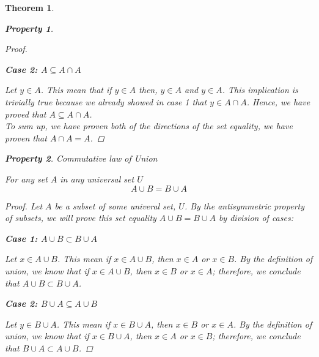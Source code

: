 \documentclass{book}
\newtheorem{theorem}{Theorem}[section]
\newtheorem{property}{Property}[theorem]
\theoremstyle{definition}
\theoremstyle{remark}
\begin{document}
\begin{theorem}
\begin{property}
\begin{proof}
            \begin{flushleft} \textbf{Case 2: $A \subseteq A \cap A$} \end{flushleft} 
                Let $y \in A$. This mean that if  $y \in A$ then, $y \in A$ and $y \in A$. This implication  is trivially true because we already showed in \textit{case 1} that $y \in A \cap A$. Hence, we have proved that $A \subseteq A \cap A$. \\
            
            To sum up, we have proven both of the directions of the set equality, we have proven that $A \cap A = A$. 
        \end{proof}
    \end{property}
    
    
    
    \newpage
    \begin{property}
    Commutative law of Union \\
        \begin{tcolorbox}
            For any set $A$ in any universal set $U$
                \begin{equation*}
                    A \cup B = B \cup A
                \end{equation*}
        \end{tcolorbox}
    
        \begin{proof}
            Let $A$ be a subset of some univeral set, $U$. By the antisymmetric property of subsets, we will prove this set equality $A \cup B = B \cup A$ by division of cases:
            
            \begin{flushleft} \textbf{Case 1: $A \cup B \subset B \cup A$} \end{flushleft}
                Let $x \in A \cup B$. This mean if $x \in A \cup B$, then $x \in A$ or $x \in B$. By the definition of union, we know that if $x \in A \cup B$, then $x \in B$ or $x \in A$; therefore, we conclude that $A \cup B \subset B \cup A$.
            
            \begin{flushleft} \textbf{Case 2: $B \cup A \subseteq A \cup B$} \end{flushleft} 
                Let $y \in B \cup A$. This mean if $x \in B \cup A$, then $x \in B$ or $x \in A$. By the definition of union, we know that if $x \in B \cup A$, then $x \in A$ or $x \in B$; therefore, we conclude that $B \cup A \subset A \cup B$.
            

\end{proof}
\end{property}
\end{theorem}
\end{document}
